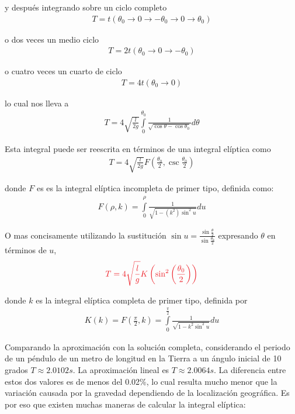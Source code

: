 \documentclass[12pt]{article}
\begin{document}
y después integrando sobre un ciclo completo
\begin{eqnarray*}
T = t(\theta_0 \to 0 \to -\theta_0 \to 0 \to \theta_0)
\end{eqnarray*}

o dos veces un medio ciclo
\begin{eqnarray*}
T=2t(\theta_0 \to 0 \to -\theta_0)
\end{eqnarray*}

o cuatro veces un cuarto de ciclo
\begin{eqnarray*}
T=4t(\theta_0 \to 0)
\end{eqnarray*}

lo cual nos lleva a
\begin{eqnarray*}
T=4 \sqrt{\frac{l}{2g}}\int\limits_0^{\theta_0} \frac{1}{\sqrt{\cos\theta - \cos\theta_0}} d\theta
\end{eqnarray*}

Esta integral puede ser reescrita en términos de una integral elíptica como
\begin{eqnarray*}
T=4 \sqrt{\frac{l}{2g}}F\left( \frac{\theta_0}{2}, \csc\frac{\theta_0}{2} \right)
\end{eqnarray*}

donde $F$ es es la integral elíptica incompleta de primer tipo, definida como:
\begin{eqnarray*}
F(\rho, k) = \int\limits_0^{\rho} \frac{1}{\sqrt{1 -(k^2)\sin^2 u}}du
\end{eqnarray*}

O mas concisamente utilizando la sustitución $\sin u = \frac{\sin\frac{\theta}{2}}{\sin\frac{\theta_0}{2}}$ expresando $\theta$ en términos de $u$,
\begin{equation}
\textcolor{Red}{T=4\sqrt{\frac{l}{g}}K\left( \sin^2 \left(\frac{\theta_0}{2} \right) \right)}
\end{equation}

donde $k$ es la integral elíptica completa de primer tipo, definida por
\begin{eqnarray*}
K(k) = F \left( \frac{\pi}{2}, k \right) = \int\limits_0^{\frac{\pi}{2}} \frac{1}{\sqrt{1-k^2 \sin^2 u}}du
\end{eqnarray*}

Comparando la aproximación con la solución completa, considerando el periodo de un péndulo de un metro de longitud en la Tierra a un ángulo inicial de 10 grados $T \approx 2.0102 s$. La aproximación lineal es $T \approx 2.0064 s$. La diferencia entre estos dos valores es de menos del 0.02\%, lo cual resulta mucho menor que la variación causada por la gravedad dependiendo de la localización geográfica. Es por eso que existen muchas maneras de calcular la integral elíptica:
\end{document}
